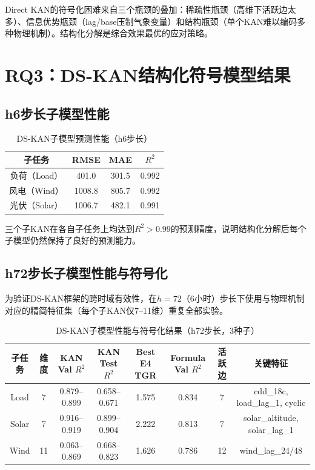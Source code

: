\documentclass[12pt,a4paper,oneside]{ctexbook}
\begin{document}
Direct KAN的符号化困难来自三个瓶颈的叠加：稀疏性瓶颈（高维下活跃边太多）、信息优势瓶颈（lag/base压制气象变量）和结构瓶颈（单个KAN难以编码多种物理机制）。结构化分解是综合效果最优的应对策略。

\section{RQ3：DS-KAN结构化符号模型结果}

\subsection{h6步长子模型性能}

\begin{table}[htbp]
\centering
\caption{DS-KAN子模型预测性能（h6步长）}
\label{tab:dskan-submodel}
\begin{tabular}{cccc}
\toprule
子任务 & RMSE & MAE & $R^2$ \\
\midrule
负荷（Load） & 401.0 & 301.5 & 0.992 \\
风电（Wind） & 1008.8 & 805.7 & 0.992 \\
光伏（Solar） & 1006.7 & 482.1 & 0.991 \\
\bottomrule
\end{tabular}
\end{table}

三个子KAN在各自子任务上均达到$R^2 > 0.99$的预测精度，说明结构化分解后每个子模型仍然保持了良好的预测能力。

\subsection{h72步长子模型性能与符号化}

为验证DS-KAN框架的跨时域有效性，在$h=72$（6小时）步长下使用与物理机制对应的精简特征集（每个子KAN仅7--11维）重复全部实验。

\begin{table}[htbp]
\centering
\caption{DS-KAN子模型性能与符号化结果（h72步长，3种子）}
\label{tab:dskan-h72}
\begin{tabular}{cccccccc}
\toprule
子任务 & 维度 & KAN Val $R^2$ & KAN Test $R^2$ & Best E4 TGR & Formula Val $R^2$ & 活跃边 & 关键特征 \\
\midrule
Load & 7 & 0.879--0.899 & 0.658--0.671 & 1.575 & 0.834 & 7 & cdd\_18c, load\_lag\_1, cyclic \\
Solar & 7 & 0.916--0.919 & 0.899--0.904 & 2.222 & 0.813 & 7 & solar\_altitude, solar\_lag\_1 \\
Wind & 11 & 0.063--0.869 & 0.668--0.823 & 1.626 & 0.786 & 12 & wind\_lag\_24/48 \\
\bottomrule
\end{tabular}
\end{table}
\end{document}
